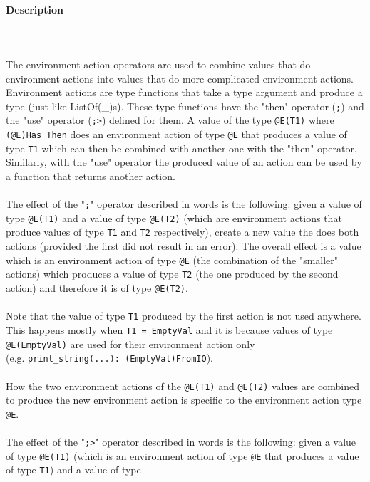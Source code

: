 \documentclass{article}
\begin{document}
\paragraph{Description}
\mbox{} \\\\
The environment action operators are used to combine values that do environment
actions into values that do more complicated environment actions. Environment
actions are type functions that take a type argument and produce a type (just
like ListOf(_)s). These type functions have the "then" operator (\verb|;|)
and the "use" operator (\verb|;>|) defined for them.  A value of the type
\verb|@E(T1)| where \verb|(@E)Has_Then| does an environment action of type
\verb|@E| that produces a value of type \verb|T1| which can then be
combined with another one with the "then" operator. Similarly, with the "use"
operator the produced value of an action can be used by a function that returns
another action.
\\\\
The effect of the "\verb|;|" operator described in words is the following:
given a value of type \verb|@E(T1)| and a value of type \verb|@E(T2)|
(which are environment actions that produce values of type \verb|T1| and
\verb|T2| respectively), create a new value the does both actions (provided
the first did not result in an error).  The overall effect is a value which is
an environment action of type \verb|@E| (the combination of the "smaller"
actions) which produces a value of type \verb|T2| (the one produced by the
second action) and therefore it is of type \verb|@E(T2)|.
\\\\
Note that the value of type \verb|T1| produced by the first action is not
used anywhere. This happens mostly when \verb|T1 = EmptyVal| and it is
because values of type \verb|@E(EmptyVal)| are used for their environment
action only \\(e.g. \verb|print_string(...): (EmptyVal)FromIO|).
\\\\
How the two environment actions of the \verb|@E(T1)| and \verb|@E(T2)|
values are combined to produce the new environment action is specific to the
environment action type \verb|@E|.
\\\\
The effect of the "\verb|;>|" operator described in words is the following:
given a value of type \verb|@E(T1)| (which is an environment action of type
\verb|@E| that produces a value of type \verb|T1|) and a value of type
\end{document}
